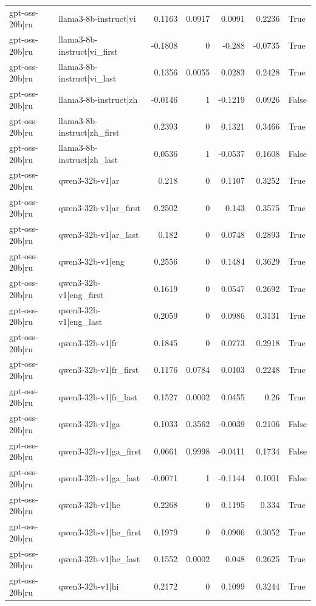 \begin{table}
\begin{tabular}{l l r r r r l}
gpt-oss-20b|ru & llama3-8b-instruct|vi & 0.1163 & 0.0917 & 0.0091 & 0.2236 & True \\
gpt-oss-20b|ru & llama3-8b-instruct|vi_first & -0.1808 & 0 & -0.288 & -0.0735 & True \\
gpt-oss-20b|ru & llama3-8b-instruct|vi_last & 0.1356 & 0.0055 & 0.0283 & 0.2428 & True \\
gpt-oss-20b|ru & llama3-8b-instruct|zh & -0.0146 & 1 & -0.1219 & 0.0926 & False \\
gpt-oss-20b|ru & llama3-8b-instruct|zh_first & 0.2393 & 0 & 0.1321 & 0.3466 & True \\
gpt-oss-20b|ru & llama3-8b-instruct|zh_last & 0.0536 & 1 & -0.0537 & 0.1608 & False \\
gpt-oss-20b|ru & qwen3-32b-v1|ar & 0.218 & 0 & 0.1107 & 0.3252 & True \\
gpt-oss-20b|ru & qwen3-32b-v1|ar_first & 0.2502 & 0 & 0.143 & 0.3575 & True \\
gpt-oss-20b|ru & qwen3-32b-v1|ar_last & 0.182 & 0 & 0.0748 & 0.2893 & True \\
gpt-oss-20b|ru & qwen3-32b-v1|eng & 0.2556 & 0 & 0.1484 & 0.3629 & True \\
gpt-oss-20b|ru & qwen3-32b-v1|eng_first & 0.1619 & 0 & 0.0547 & 0.2692 & True \\
gpt-oss-20b|ru & qwen3-32b-v1|eng_last & 0.2059 & 0 & 0.0986 & 0.3131 & True \\
gpt-oss-20b|ru & qwen3-32b-v1|fr & 0.1845 & 0 & 0.0773 & 0.2918 & True \\
gpt-oss-20b|ru & qwen3-32b-v1|fr_first & 0.1176 & 0.0784 & 0.0103 & 0.2248 & True \\
gpt-oss-20b|ru & qwen3-32b-v1|fr_last & 0.1527 & 0.0002 & 0.0455 & 0.26 & True \\
gpt-oss-20b|ru & qwen3-32b-v1|ga & 0.1033 & 0.3562 & -0.0039 & 0.2106 & False \\
gpt-oss-20b|ru & qwen3-32b-v1|ga_first & 0.0661 & 0.9998 & -0.0411 & 0.1734 & False \\
gpt-oss-20b|ru & qwen3-32b-v1|ga_last & -0.0071 & 1 & -0.1144 & 0.1001 & False \\
gpt-oss-20b|ru & qwen3-32b-v1|he & 0.2268 & 0 & 0.1195 & 0.334 & True \\
gpt-oss-20b|ru & qwen3-32b-v1|he_first & 0.1979 & 0 & 0.0906 & 0.3052 & True \\
gpt-oss-20b|ru & qwen3-32b-v1|he_last & 0.1552 & 0.0002 & 0.048 & 0.2625 & True \\
gpt-oss-20b|ru & qwen3-32b-v1|hi & 0.2172 & 0 & 0.1099 & 0.3244 & True \\

\end{tabular}
\end{table}
